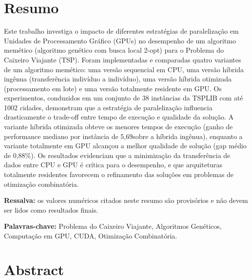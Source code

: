 
\maketitle

\clearpage

\section*{Resumo}\label{resumo}

Este trabalho investiga o impacto de diferentes estratégias de paralelização em Unidades de Processamento Gráfico (GPUs) no desempenho de um algoritmo memético (algoritmo genético com busca local 2-opt) para o Problema do Caixeiro Viajante (TSP).
Foram implementadas e comparadas quatro variantes de um algoritmo memético: uma versão sequencial em CPU, uma versão híbrida ingênua (transferência indivíduo a indivíduo), uma versão híbrida otimizada (processamento em lote) e uma versão totalmente residente em GPU.
Os experimentos, conduzidos em um conjunto de 38 instâncias da TSPLIB com até 1002 cidades, demonstram que a estratégia de paralelização influencia drasticamente o trade-off entre tempo de execução e qualidade da solução. A variante híbrida otimizada obteve os menores tempos de execução (ganho de performance mediano por instância de 5,69\times sobre a híbrida ingênua), enquanto a variante totalmente em GPU alcançou a melhor qualidade de solução (gap médio de 0,88\%).
Os resultados evidenciam que a minimização da transferência de dados entre CPU e GPU é crítica para o desempenho, e que arquiteturas totalmente residentes favorecem o refinamento das soluções em problemas de otimização combinatória.

\textbf{Ressalva:} os valores numéricos citados neste resumo são provisórios e não devem ser lidos como resultados finais.

\textbf{Palavras-chave:} Problema do Caixeiro Viajante, Algoritmos Genéticos, Computação em GPU, CUDA, Otimização Combinatória.

\clearpage

\section*{Abstract}\label{abstract}

